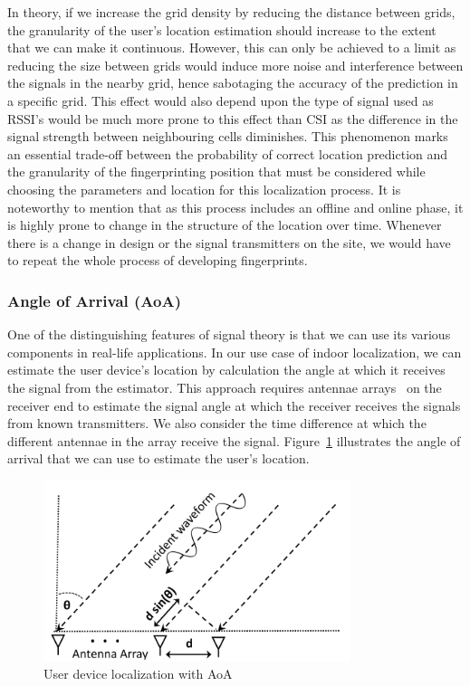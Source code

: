 \documentclass[a4paper,singleside,12pt]{report} %
\begin{document}
					In theory, if we increase the grid density by reducing the distance between grids, the granularity of the user's location estimation should increase to the extent that we can make it continuous. 
					However, this can only be achieved to a limit as reducing the size between grids would induce more noise and interference between the signals in the nearby grid, hence sabotaging the accuracy of the prediction in a specific grid. 
					This effect would also depend upon the type of signal used as RSSI's would be much more prone to this effect than CSI as the difference in the signal strength between neighbouring cells diminishes. 
					This phenomenon marks an essential trade-off between the probability of correct location prediction and the granularity of the fingerprinting position that must be considered while choosing the parameters and location for this localization process. 
					It is noteworthy to mention that as this process includes an offline and online phase, it is highly prone to change in the structure of the location over time. 
					Whenever there is a change in design or the signal transmitters on the site, we would have to repeat the whole process of developing fingerprints.   

				\subsubsection{Angle of Arrival (AoA)} 
					One of the distinguishing features of signal theory is that we can use its various components in real-life applications. 
					In our use case of indoor localization, we can estimate the user device's location by calculation the angle at which it receives the signal from the estimator. 
					This approach requires antennae arrays~\cite{xiong2013arraytrack} on the receiver end to estimate the signal angle at which the receiver receives the signals from known transmitters. 
					We also consider the time difference at which the different antennae in the array receive the signal.
					Figure~\ref{fig2.2} illustrates the angle of arrival that we can use to estimate the user's location. 
					
					\begin{figure}[!htb]
					\centerline{\includegraphics[width=0.8\textwidth]{./figures/AoA-indoor-localization.png}}
					\caption{User device localization with AoA}
					\label{fig2.2}
					\end{figure}
					
\end{document}
